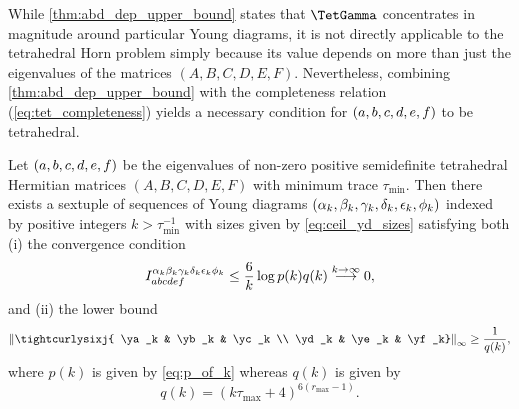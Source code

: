 \documentclass[notitlepage, 10pt]{article}
\begin{document}
While \cref{thm:abd_dep_upper_bound} states that $\TetGamma$ concentrates in magnitude around particular Young diagrams, it is not directly applicable to the tetrahedral Horn problem simply because its value depends on more than just the eigenvalues of the matrices $(A,B,C,D,E,F)$.
Nevertheless, combining \cref{thm:abd_dep_upper_bound} with the completeness relation (\cref{eq:tet_completeness}) yields a necessary condition for $(a,b,c,d,e,f)$ to be tetrahedral.
\begin{cor}
    \label{cor:tet_sixj_lower_bound}
    Let $(a,b,c,d,e,f)$ be the eigenvalues of non-zero positive semidefinite tetrahedral Hermitian matrices $(A,B,C,D,E,F)$ with minimum trace $\tau_{\min}$.
    Then there exists a sextuple of sequences of Young diagrams $(\alpha_k, \beta_k, \gamma_k, \delta_k, \epsilon_k, \phi_k)$ indexed by positive integers $k > \tau_{\min}^{-1}$ with sizes given by \cref{eq:ceil_yd_sizes}
    satisfying both (i) the convergence condition
    \begin{equation}
        \label{eq:sextuple_convergence_rate}
        I^{\alpha_k\beta_k\gamma_k\delta_k\epsilon_k\phi_k}_{abcdef}
        \leq \frac{6}{k} \log p(k) q(k)
        \stackrel{k\to\infty}{\longrightarrow} 0,
    \end{equation}
    and (ii) the lower bound
    \begin{equation}
        \label{eq:ud_sixj_lower_bound}
        \norm{\tightcurlysixj{ \ya_k & \yb_k & \yc_k \\ \yd_k &  \ye_k &  \yf_k}}_{\infty}
        \geq \frac{1}{q(k)},
    \end{equation}
    where $p(k)$ is given by \cref{eq:p_of_k} whereas $q(k)$ is given by
    \begin{equation}
        \label{eq:q_of_k}
        q(k) = (k \tau_{\max} +4)^{6(r_{\max}-1)}.
    \end{equation}
\end{cor}
\end{document}
